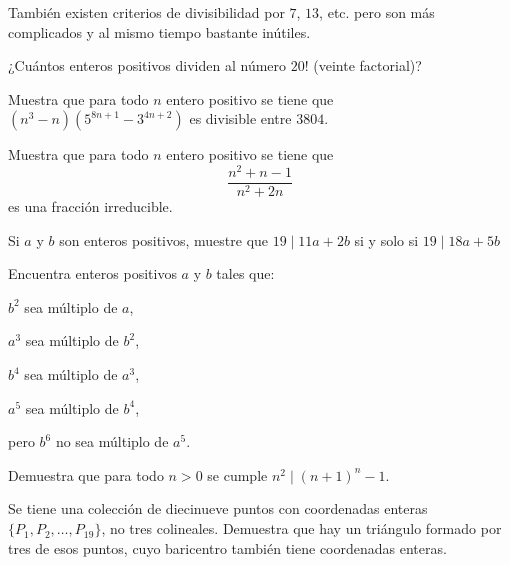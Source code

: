 También existen criterios de divisibilidad por $7$, $13$, etc. pero son más
complicados y al mismo tiempo bastante inútiles.


\begin{problema}
¿Cuántos enteros positivos dividen al número $20!$ (veinte factorial)?
\end{problema}

\begin{problema}
Muestra que para todo $n$ entero positivo se tiene que $(n^3-n)(5^{8n+1}-3^{4n+2})$ es divisible entre $3804$.
\end{problema}

\begin{problema}
Muestra que para todo $n$ entero positivo se tiene que $$\frac{n^2+n-1}{n^2+2n}$$ es una fracción irreducible.
\end{problema}

\begin{problema}
Si $a$ y $b$ son enteros positivos, muestre que $19\mid 11a+2b$ si y solo si $19\mid 18a+5b$
\end{problema}

\begin{problema}
Encuentra enteros positivos $a$ y $b$ tales que:

$b^2$ sea múltiplo de $a$,

$a^3$ sea múltiplo de $b^2$,

$b^4$ sea múltiplo de $a^3$,

$a^5$ sea múltiplo de $b^4$,

pero $b^6$ no sea múltiplo de $a^5$.
\end{problema}

\newpage
\begin{problema}
  Demuestra que para todo $n > 0$ se cumple $n^2 \mid (n+1)^n - 1$.
\end{problema}


\begin{problema}
  Se tiene una colección de diecinueve puntos con coordenadas enteras $\{P_1,P_2,\dots, P_19\}$, no tres colineales. Demuestra que hay un triángulo formado por tres de esos puntos, cuyo baricentro también tiene coordenadas enteras.
\end{problema}


